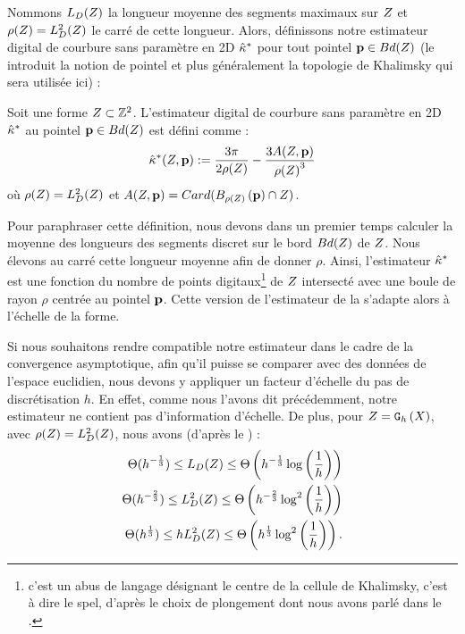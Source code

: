 Nommons $L_D({Z})$ la longueur moyenne des segments maximaux sur
$Z$ et $\rho(Z) = L_D^2({Z})$ le carré de cette
longueur.  Alors, définissons notre estimateur digital de courbure sans
paramètre en 2D $\hat{\kappa}^{*}$ pour tout pointel $\mathbf{p} \in Bd({Z})$ (le
 introduit la notion de pointel et plus
généralement la topologie de Khalimsky qui sera utilisée ici) :
%
\begin{definition}
  \label{def:curvature-estimator-2d-pf}
  Soit une forme $Z \subset \mathbb{Z}^2$. L'estimateur digital de courbure
  sans paramètre en 2D $\hat{\kappa}^{*}$ au pointel $\mathbf{p} \in Bd({Z})$ est défini
  comme :
  \begin{equation}
    \hat{\kappa}^{*}( Z, \mathbf{p}) := \frac{3\pi}{2 \rho(Z)} - \frac{3 A(Z,\mathbf{p})}{{\rho(Z)}^3}
  \end{equation}
  où $\rho(Z) =L_D^2(Z)$ et $A(Z,\mathbf{p}) =
  Card(B_{\rho(Z)}\left(\mathbf{p}\right) \cap Z)$.
\end{definition}
%
Pour paraphraser cette définition, nous devons dans un premier temps calculer la
moyenne des longueurs des segments discret sur le bord $Bd({Z})$ de
$Z$. Nous élevons au carré cette longueur moyenne afin de donner $\rho$.
Ainsi, l'estimateur $\hat{\kappa}^{*}$ est une fonction du nombre de points
digitaux\footnote{c'est un abus de langage désignant le centre de la cellule de
Khalimsky, c'est à dire le spel, d'après le choix de plongement dont nous avons
parlé dans le .} de $Z$ intersecté avec une
boule de rayon $\rho$ centrée au pointel $\mathbf{p}$. Cette version de l'estimateur de
la  s'adapte alors à l’échelle de la
forme.


Si nous souhaitons rendre compatible notre estimateur dans le cadre de la
convergence asymptotique, afin qu'il puisse se comparer avec des données de
l'espace euclidien, nous devons y appliquer un facteur d'échelle du pas de
discrétisation $h$. En effet, comme nous l'avons dit précédemment, notre
estimateur ne contient pas d'information d'échelle. De plus, pour $Z =
\mathtt{G}_{h}\left(X\right)$, avec $\rho(Z) = L^2_D(Z)$, nous avons (d'après le
) :
%
\begin{align}
  \Theta(h^{-\frac{1}{3}}) \le L_D( Z ) \le \Theta\left(h^{-\frac{1}{3}} \log \left(\frac{1}{h}\right)\right) \\
  \Theta(h^{-\frac{2}{3}}) \le L^2_D( Z ) \le \Theta\left(h^{-\frac{2}{3}} \log^2 \left(\frac{1}{h}\right)\right) \\
  \Theta(h^{\frac{1}{3}}) \le hL^2_D( Z ) \le \Theta\left(h^{\frac{1}{3}} \log^2 \left(\frac{1}{h}\right)\right) \label{eq:bounds-length-MDSS}.
\end{align}
%



